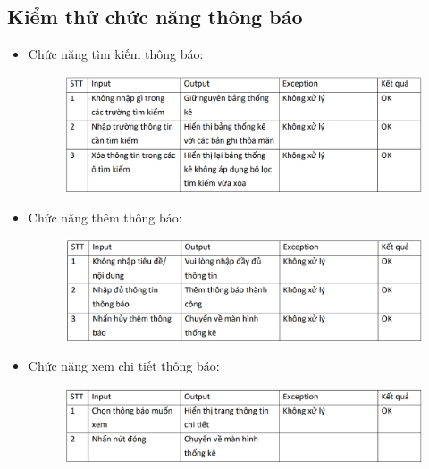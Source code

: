\documentclass{article}
\begin{document}
\subsection{Kiểm thử chức năng thông báo}
\begin{itemize}
    \item Chức năng tìm kiếm thông báo:
    \begin{figure}[H]
        \centering
        \includegraphics[width=1\textwidth]{Kiểm thử/Kt tìm kiếm khoản thu.png}
    \end{figure}
    \item Chức năng thêm thông báo:
    \begin{figure}[H]
        \centering
        \includegraphics[width=1\textwidth]{Kiểm thử/KT thêm thông báo.png}
    \end{figure}
    \item Chức năng xem chi tiết thông báo:
    \begin{figure}[H]
        \centering
        \includegraphics[width=1\textwidth]{Kiểm thử/KT chi tiết thông báo.png}
    \end{figure}    
\end{itemize}
\end{document}

